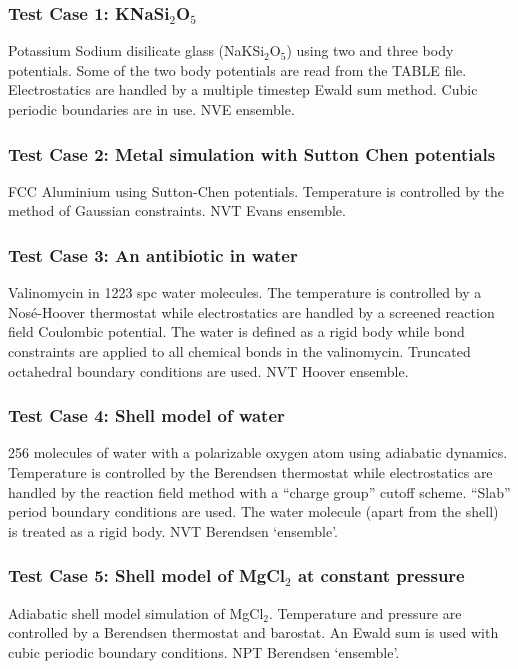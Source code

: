 \subsubsection{Test Case 1: KNaSi$_2$O$_5$}
Potassium Sodium disilicate glass (NaKSi$_2$O$_5$) using two and three body
potentials.  Some of the two body potentials are read from the TABLE
file. Electrostatics are handled by a multiple timestep Ewald sum
method. Cubic periodic boundaries are in use. NVE ensemble.

\subsubsection{Test Case 2: Metal simulation with Sutton Chen potentials}
FCC Aluminium using Sutton-Chen potentials. Temperature is controlled
by the method of Gaussian constraints. NVT Evans ensemble.

\subsubsection{Test Case 3: An antibiotic in water} 
Valinomycin in 1223 spc water molecules. The temperature is controlled by a
Nos\'e-Hoover thermostat while electrostatics are handled by a screened
reaction field Coulombic potential. The water is defined as a rigid body while
bond constraints are applied to all chemical bonds in the
valinomycin. Truncated octahedral boundary conditions are used. NVT Hoover
ensemble.

\subsubsection{Test Case 4: Shell model of water}
256 molecules of water with a polarizable oxygen atom using adiabatic
dynamics. Temperature is controlled by the Berendsen thermostat while
electrostatics are handled by the reaction field method with a ``charge
group'' cutoff scheme. ``Slab'' period boundary conditions are used. The water
molecule (apart from the shell) is treated as a rigid body. NVT Berendsen
`ensemble'.

\subsubsection{Test Case 5: Shell model of MgCl$_2$ at constant pressure}
Adiabatic shell model simulation of MgCl$_2$. Temperature and pressure are
controlled by a Berendsen thermostat and barostat. An Ewald sum is used with
cubic periodic boundary conditions. NPT Berendsen `ensemble'.

